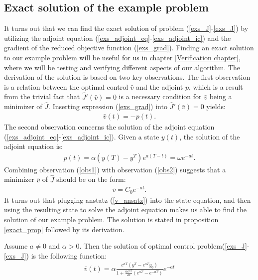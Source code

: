 \subsection{Exact solution of the example problem}
It turns out that we can find the exact solution of problem (\ref{exs_J}-\ref{exs_J}) by utilizing the adjoint equation (\ref{exs_adjoint_eq}-\ref{exs_adjoint_ic}) and the gradient of the reduced objective function (\ref{exs_grad}). Finding an exact solution to our example problem will be useful for us in chapter \ref{Verification chapter}, where we will be testing and verifying different aspects of our algorithm. The derivation of the solution is based on two key observations. The first observation is a relation between the optimal control $\bar v$ and the adjoint $p$, which is a result from the trivial fact that $\hat J'(\bar v)=0$ is a necessary condition for $\bar v$ being a minimizer of $\hat J$. Inserting expression (\ref{exs_grad}) into $\hat J'(\bar v)=0$ yields:
\begin{align}
\bar v(t)=-p(t). \label{obs1}
\end{align} 
The second observation concerns the solution of the adjoint equation (\ref{exs_adjoint_eq}-\ref{exs_adjoint_ic}). Given a state $y(t)$, the solution of the adjoint equation is:
\begin{align}
p(t) = \alpha(y(T)-y^T)e^{a(T-t)} = \omega e^{-at}. \label{obs2}
\end{align}
Combining observation (\ref{obs1}) with observation (\ref{obs2}) suggests that a minimizer $\bar v$ of $\hat J$ should be on the form:
\begin{align}
\bar v = C_0 e^{-at}. \label{v_ansatz}
\end{align}
It turns out that plugging anstatz (\ref{v_ansatz}) into the state equation, and then using the resulting state to solve the adjoint equation makes us able to find the solution of our example problem. The solution is stated in proposition \ref{exact_prop} followed by its derivation.
\begin{proposition} \label{exact_prop}
Assume $a\neq0$ and $\alpha>0$. Then the solution of optimal control problem(\ref{exs_J}-\ref{exs_J}) is the following function:
\begin{align}
\bar v(t) = \alpha\frac{e^{aT}(y^T-e^{aT}y_0)}{1+\frac{\alpha e^{aT}}{2a}(e^{aT}-e^{-aT})}e^{-at}
\end{align}
\end{proposition}

